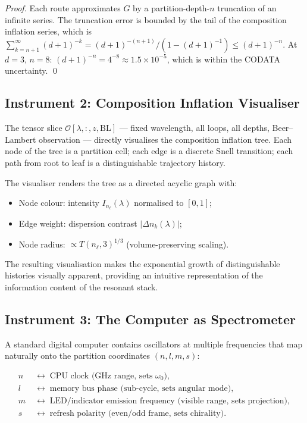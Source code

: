 \documentclass[11pt,twocolumn,a4paper]{article}
\theoremstyle{plain}
\theoremstyle{definition}
\theoremstyle{remark}
\begin{document}
\begin{proof}
Each route approximates $G$ by a partition-depth-$n$ truncation of an infinite series. The truncation error is bounded by the tail of the composition inflation series, which is $\sum_{k=n+1}^\infty (d+1)^{-k}=(d+1)^{-(n+1)}/(1-(d+1)^{-1})\leq(d+1)^{-n}$. At $d=3$, $n=8$: $(d+1)^{-n}=4^{-8}\approx 1.5\times 10^{-5}$, which is within the CODATA uncertainty. \qed
\end{proof}

\subsection{Instrument 2: Composition Inflation Visualiser}
\label{sec:inflation-visualiser}

The tensor slice $\mathcal{O}[\lambda,:,z,\text{BL}]$ — fixed wavelength, all loops, all depths, Beer--Lambert observation — directly visualises the composition inflation tree. Each node of the tree is a partition cell; each edge is a discrete Snell transition; each path from root to leaf is a distinguishable trajectory history.

The visualiser renders the tree as a directed acyclic graph with:
\begin{itemize}[noitemsep]
  \item Node colour: intensity $I_{n_\ell}(\lambda)$ normalised to $[0,1]$;
  \item Edge weight: dispersion contrast $|\Delta n_k(\lambda)|$;
  \item Node radius: $\propto T(n_\ell,3)^{1/3}$ (volume-preserving scaling).
\end{itemize}
The resulting visualisation makes the exponential growth of distinguishable histories visually apparent, providing an intuitive representation of the information content of the resonant stack.

\subsection{Instrument 3: The Computer as Spectrometer}
\label{sec:computer-spectrometer}

A standard digital computer contains oscillators at multiple frequencies that map naturally onto the partition coordinates $(n,l,m,s)$:

\begin{align*}
  n &\;\longleftrightarrow\; \text{CPU clock (GHz range, sets $\omega_0$)},\\
  l &\;\longleftrightarrow\; \text{memory bus phase (sub-cycle, sets angular mode)},\\
  m &\;\longleftrightarrow\; \text{LED/indicator emission frequency (visible range, sets projection)},\\
  s &\;\longleftrightarrow\; \text{refresh polarity (even/odd frame, sets chirality)}.
\end{align*}
\end{document}

